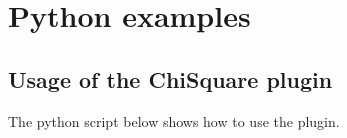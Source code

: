 \section{Python examples}

\subsection{Usage of the ChiSquare plugin}
The python script below shows how to use the plugin. 

\begin{singlespace}

\end{singlespace}

